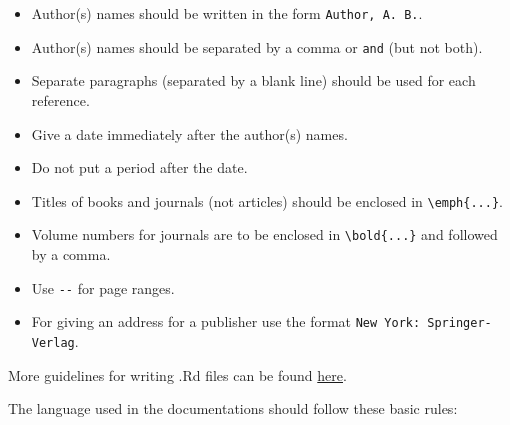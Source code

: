 \documentclass[
]{book}
\providecommand{\tightlist}{%
  \setlength{\itemsep}{0pt}\setlength{\parskip}{0pt}}
\begin{document}
\begin{enumerate}
  \begin{itemize}
  \tightlist
  \item
    Author(s) names should be written in the form \texttt{Author,\ A.\ B.}.
  \item
    Author(s) names should be separated by a comma or \texttt{and} (but not both).
  \item
    Separate paragraphs (separated by a blank line) should be used for each reference.
  \item
    Give a date immediately after the author(s) names.
  \item
    Do not put a period after the date.
  \item
    Titles of books and journals (not articles) should be enclosed in \texttt{\textbackslash{}emph\{...\}}.
  \item
    Volume numbers for journals are to be enclosed in \texttt{\textbackslash{}bold\{...\}} and followed by a comma.
  \item
    Use \texttt{-\/-} for page ranges.
  \item
    For giving an address for a publisher use the format \texttt{New\ York:\ Springer-Verlag}.
  \end{itemize}
\end{enumerate}

More guidelines for writing .Rd files can be found \href{https://developer.r-project.org/Rds.html}{here}.

The language used in the documentations should follow these basic rules:
\end{document}

